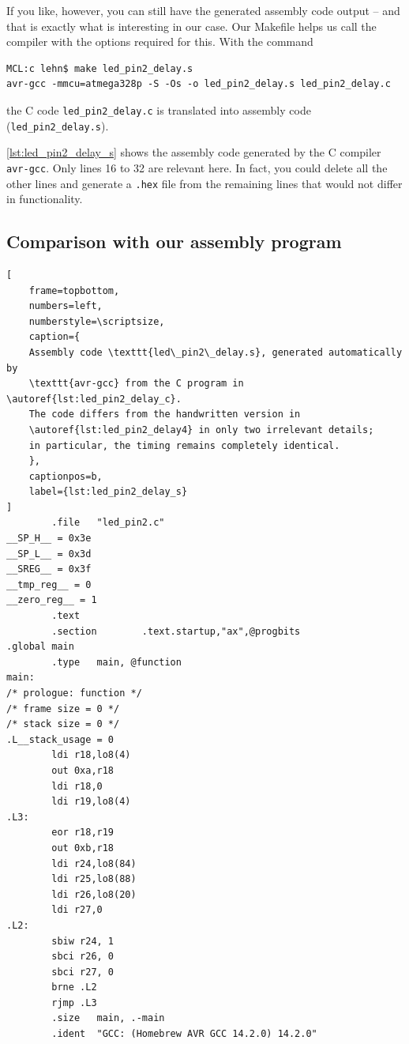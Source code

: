 \documentclass[a4paper,12pt]{article}
\begin{document}
If you like, however, you can still have the generated assembly code output
– and that is exactly what is interesting in our case. Our Makefile helps us
call the compiler with the options required for this.
With the command

\begin{lstlisting}
MCL:c lehn$ make led_pin2_delay.s
avr-gcc -mmcu=atmega328p -S -Os -o led_pin2_delay.s led_pin2_delay.c
\end{lstlisting}

\noindent
the C code \texttt{led\_pin2\_delay.c} is translated into assembly code
(\texttt{led\_pin2\_delay.s}).

\autoref{lst:led_pin2_delay_s} shows the assembly code generated by the C
compiler \texttt{avr-gcc}. Only lines 16 to 32 are relevant here.
In fact, you could delete all the other lines and generate a \texttt{.hex}
file from the remaining lines that would not differ in functionality.

\newpage
\subsection{Comparison with our assembly program}

\begin{listing}[htbp]
\begin{lstlisting}[
    frame=topbottom,
    numbers=left,
    numberstyle=\scriptsize,
    caption={
	Assembly code \texttt{led\_pin2\_delay.s}, generated automatically by
	\texttt{avr-gcc} from the C program in \autoref{lst:led_pin2_delay_c}.
	The code differs from the handwritten version in
	\autoref{lst:led_pin2_delay4} in only two irrelevant details;
	in particular, the timing remains completely identical.
    },
    captionpos=b,
    label={lst:led_pin2_delay_s}
]
        .file   "led_pin2.c"
__SP_H__ = 0x3e
__SP_L__ = 0x3d
__SREG__ = 0x3f
__tmp_reg__ = 0
__zero_reg__ = 1
        .text
        .section        .text.startup,"ax",@progbits
.global main
        .type   main, @function
main:
/* prologue: function */
/* frame size = 0 */
/* stack size = 0 */
.L__stack_usage = 0
        ldi r18,lo8(4)
        out 0xa,r18
        ldi r18,0
        ldi r19,lo8(4)
.L3:
        eor r18,r19
        out 0xb,r18
        ldi r24,lo8(84)
        ldi r25,lo8(88)
        ldi r26,lo8(20)
        ldi r27,0
.L2:
        sbiw r24, 1
        sbci r26, 0
        sbci r27, 0
        brne .L2
        rjmp .L3
        .size   main, .-main
        .ident  "GCC: (Homebrew AVR GCC 14.2.0) 14.2.0"
\end{lstlisting}
\end{listing}
\end{document}
